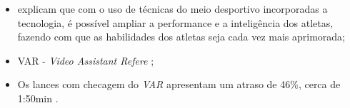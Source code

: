 \begin{itemize}
    \item {} explicam que com o uso de técnicas do meio desportivo incorporadas
    a tecnologia, é possível ampliar a performance e a inteligência dos atletas, fazendo com
    que as habilidades dos atletas seja cada vez mais aprimorada;
    \item VAR - \textit{Video Assistant Refere} \cite{CANALTECH2019};
    \item Os lances com checagem do \textit{VAR} apresentam
    um atraso de 46\%, cerca de 1:50min \cite{ESTADAO2019}.
\end{itemize}